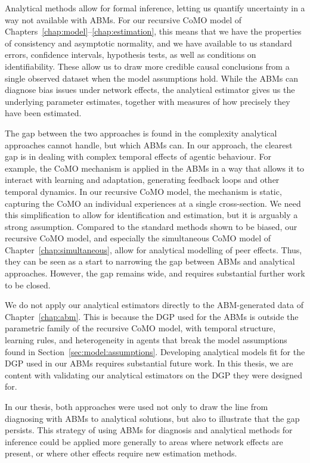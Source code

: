 Analytical methods allow for formal inference, letting us quantify uncertainty in a way not available with ABMs. For our recursive CoMO model of Chapters~\ref{chap:model}--\ref{chap:estimation}, this means that we have the properties of consistency and asymptotic normality, and we have available to us standard errors, confidence intervals, hypothesis tests, as well as conditions on identifiability. These allow us to draw more credible causal conclusions from a single observed dataset when the model assumptions hold. While the ABMs can diagnose bias issues under network effects, the analytical estimator gives us the underlying parameter estimates, together with measures of how precisely they have been estimated.

The gap between the two approaches is found in the complexity analytical approaches cannot handle, but which ABMs can. In our approach, the clearest gap is in dealing with complex temporal effects of agentic behaviour. For example, the CoMO mechanism is applied in the ABMs in a way that allows it to interact with learning and adaptation, generating feedback loops and other temporal dynamics. In our recursive CoMO model, the mechanism is static, capturing the CoMO an individual experiences at a single cross-section. We need this simplification to allow for identification and estimation, but it is arguably a strong assumption. Compared to the standard methods shown to be biased, our recursive CoMO model, and especially the simultaneous CoMO model of Chapter~\ref{chap:simultaneous}, allow for analytical modelling of peer effects. Thus, they can be seen as a start to narrowing the gap between ABMs and analytical approaches. However, the gap remains wide, and requires substantial further work to be closed.

We do not apply our analytical estimators directly to the ABM-generated data of Chapter~\ref{chap:abm}. This is because the DGP used for the ABMs is outside the parametric family of the recursive CoMO model, with temporal structure, learning rules, and heterogeneity in agents that break the model assumptions found in Section~\ref{sec:model:assumptions}. Developing analytical models fit for the DGP used in our ABMs requires substantial future work. In this thesis, we are content with validating our analytical estimators on the DGP they were designed for.

In our thesis, both approaches were used not only to draw the line from diagnosing with ABMs to analytical solutions, but also to illustrate that the gap persists. This strategy of using ABMs for diagnosis and analytical methods for inference could be applied more generally to areas where network effects are present, or where other effects require new estimation methods.

